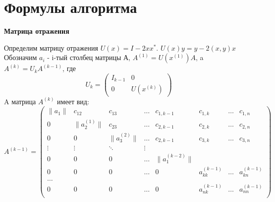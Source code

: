 \documentclass[a4paper,12pt]{article}
\begin{document}
\section{Формулы алгоритма}
\begin{center}
{\bfseries Матрица отражения}
\end{center}
Определим матрицу отражения $U(x) = I - 2 x x^{*}$. $U(x)y = y - 2(x,y)x$
Обозначим $a_{i}$ - i-тый столбец матрицы А,  $A^{(1)} = U(x^{(1)})A$, a $A^{(k)} = U_{k}A^{(k-1)}$, где 
$$U_{k}=
   \begin{pmatrix}
     I_{k-1}&0 \\
     0& U(x^{(k)})
    \end{pmatrix}
$$
A матрица $A^{(k)}$ имеет вид:
$$A^{(k-1)}=
   \begin{pmatrix}
     \|a_{1}\|& c_{12} &  c_{13} &\ldots & c_{1,k-1} & c_{1,k} & \ldots &  c_{1,n}\\
     0& \|a_{2}^{(1)}\| &  c_{23} &\ldots & c_{2,k-1} &c_{2,k} & \ldots &  c_{2,n}\\
     0& 0 & \|a_{3}^{(2)}\| &\ldots & c_{2,k-1 }& c_{3,k} & \ldots &  c_{3,n}\\
     \vdots& \vdots &\ddots & \vdots\\
    0& 0&  0 &\ldots &\|a_{1}^{(k-2)}\| \\
     0& 0&  0 &\ldots & 0 & a_{kk}^{(k-1)} & \ldots & a_{kn}^{(k-1)} \\
     \ldots \\
     0& 0&  0 &\ldots & 0 & a_{nk}^{(k-1)} & \ldots & a_{nn}^{(k-1)} \\
    \end{pmatrix}
$$
\end{document}
